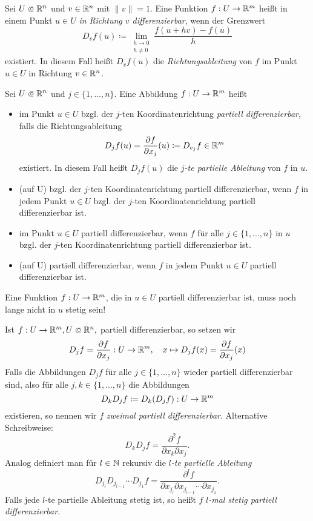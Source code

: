 \documentclass{cheat-sheet}
\newcommand\opn{\mathrel{\ooalign{$\subset$\cr
  \hidewidth\raise.1ex\hbox{$\circ\mkern.5mu$}\cr}}}
\begin{document}
\begin{defn}
Sei $U \opn \R^n$ und $v \in \mathbb{R}^n$ mit $\| v \| = 1$. Eine Funktion $f : U \to \mathbb{R}^m$ heißt in einem Punkt $u \in U$ \emph{in Richtung $v$ differenzierbar}, wenn der Grenzwert
\[ D_v f(u) \coloneqq \lim_{\substack{h \to 0\\h \not= 0}} \frac{f(u + hv) - f(u)}{h} \]
existiert. In diesem Fall heißt $D_v f(u)$ die \emph{Richtungsableitung} von $f$ im Punkt $u \in U$ in Richtung $v \in \mathbb{R}^n$.
\end{defn}

\begin{defn}
Sei $U \opn \R^n$ und $j \in \{ 1, ..., n \}$. Eine Abbildung $f : U \to \mathbb{R}^m$ heißt
\begin{itemize}
  \item im Punkt $u \in U$ bzgl. der $j$-ten Koordinatenrichtung \emph{partiell differenzierbar}, falls die Richtungsableitung
  \[ D_j f(u) = \frac{\partial f}{\partial x_j}(u) \coloneqq D_{e_j} f \in \mathbb{R}^m \]
  existiert. In diesem Fall heißt $D_j f(u)$ die \emph{$j$-te partielle Ableitung} von $f$ in $u$.
  \item (auf U) bzgl. der $j$-ten Koordinatenrichtung partiell differenzierbar, wenn $f$ in jedem Punkt $u \in U$ bzgl. der $j$-ten Koordinatenrichtung partiell differenzierbar ist.
  \item im Punkt $u \in U$ partiell differenzierbar, wenn $f$ für alle $j \in \{ 1, ..., n \}$ in $u$ bzgl. der $j$-ten Koordinatenrichtung partiell differenzierbar ist.
  \item (auf U) partiell differenzierbar, wenn $f$ in jedem Punkt $u \in U$ partiell differenzierbar ist.
\end{itemize}
\end{defn}

\begin{acht}
Eine Funktion $f : U \to \mathbb{R}^m$, die in $u \in U$ partiell differenzierbar ist, muss noch lange nicht in $u$ stetig sein!
\end{acht}

\begin{defn}
Ist $f : U \to \R^m, U \opn \R^n,$ partiell differenzierbar, so setzen wir
\[ D_j f = \frac{\partial f}{\partial x_j} : U \to \mathbb{R}^m,\quad x \mapsto D_j f(x) = \frac{\partial f}{\partial x_j}(x) \]
Falls die Abbildungen $D_j f$ für alle $j \in \{ 1, ..., n \}$ wieder partiell differenzierbar sind, also für alle $j, k \in \{ 1, ..., n \}$ die Abbildungen
\[ D_k D_j f \coloneqq D_k (D_j f) : U \to \mathbb{R}^m \]
existieren, so nennen wir $f$ \emph{zweimal partiell differenzierbar}. Alternative Schreibweise:
\[ D_k D_j f = \frac{\partial^2 f}{\partial x_k \partial x_j}. \]
Analog definiert man für $l \in \mathbb{N}$ rekursiv die \emph{$l$-te partielle Ableitung}
\[ D_{j_l} D_{j_{l-1}} \cdots D_{j_1} f = \frac{\partial^l f}{\partial x_{j_l} \partial x_{j_{l-1}} \cdots \partial x_{j_1}}. \]
Falls jede $l$-te partielle Ableitung stetig ist, so heißt $f$ \emph{$l$-mal stetig partiell differenzierbar}.
\end{defn}
\end{document}
